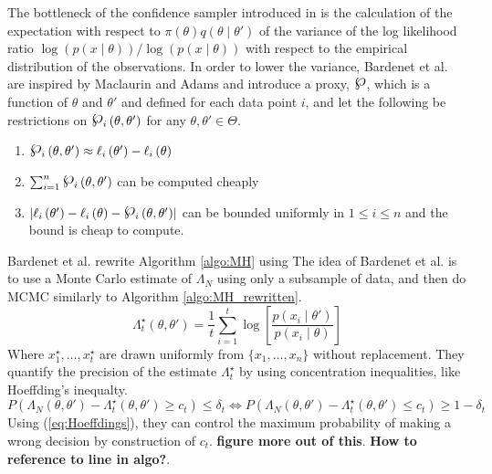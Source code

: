 {The bottleneck of the confidence sampler introduced in \cite{Bardenet:2} is the calculation of the expectation with respect to $\pi\left(\theta\right)q\left(\theta \mid \theta'\right)$ of the variance of the log likelihood ratio $\log \left(p\left(x\mid \theta\right)\right) / \log \left(p\left(x\mid \theta\right)\right)$ with respect to the empirical distribution of the observations.
In order to lower the variance, Bardenet et al. are inspired by Maclaurin and Adams and introduce a proxy, $\powerset$, which is a function of $\theta$ and $\theta'$ and defined for each data point $i$, and let the following be restrictions on $\powerset_i\left(\theta, \theta'\right)$ for any $\theta, \theta' \in \Theta$. 
\begin{enumerate}
    \item $\powerset_i\left(\theta, \theta'\right) \approx \ell_i\left(\theta'\right) - \ell_i\left(\theta\right)$
    \item $ \sum_{i = 1}^n \powerset_i\left(\theta, \theta'\right)$ can be computed cheaply
    \item $\left| \ell_i\left(\theta'\right) - \ell_i\left(\theta\right) - \powerset_i\left(\theta, \theta'\right)\right|$ can be bounded uniformly in $1\leq i \leq n$ and the bound is cheap to compute. 
\end{enumerate}
Bardenet et al. rewrite Algorithm \ref{algo:MH} using 
The idea of Bardenet et al. \cite{Bardenet:2} is to use a Monte Carlo estimate of $\Lambda_N$ using only a subsample of data,  and then do MCMC similarly to Algorithm \ref{algo:MH_rewritten}. 
\begin{equation*}
    \Lambda^{\star}_t\left(\theta, \theta'\right) = \frac{1}{t}\sum_{i = 1}^t \log\left[\frac{p\left(x_i\mid\theta'\right)}{p\left(x_i\mid \theta\right)}\right] 
\end{equation*}
Where $x^{\star}_1, \ldots, x^{\star}_t$ are drawn uniformly from $\{x_1, \ldots, x_n\}$ without replacement.  
They quantify the precision of the estimate $\Lambda_t^{\star}$ by using concentration inequalities, like Hoeffding's inequalty.  \begin{equation}\label{eq:Hoeffdings}
    P\left(\Lambda_N \left(\theta, \theta'\right) - \Lambda_t^{\star}\left(\theta, \theta'\right) \geq c_t \right) \leq \delta_t \iff P\left(\Lambda_N\left(\theta, \theta'\right) - \Lambda_t^{\star}\left(\theta, \theta'\right) \leq c_t\right) \geq 1 - \delta_t 
\end{equation}
Using (\ref{eq:Hoeffdings}), they can control the maximum probability of making a wrong decision by construction of $c_t$.  \textbf{figure more out of this}. \textbf{How to reference to line in algo?}. 
}
